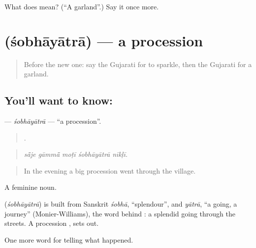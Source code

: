 \begin{tcolorbox}[breakable,colback=teal!4,colframe=teal!35!black,title={Before you move on}]
What does  mean? (\textquotedblleft{}A garland\textquotedblright{}.) Say it once more.
\end{tcolorbox}
\section[\texorpdfstring{\gu{શોભાયાત્રા} (śobhāyātrā)}{શોભાયાત્રા (śobhāyātrā)}]{ (śobhāyātrā) — a procession}

\label{lesson:GU-C329-sobhayatra}



\begin{quote}
Before the new one: say the Gujarati for to sparkle, then the Gujarati for a garland.
\end{quote}

\subsection*{You'll want to know: }
\textbf{} — \emph{śobhāyātrā} — \textquotedblleft{}a procession\textquotedblright{}.

\begin{quote}
    .
\end{quote}

\begin{quote}
\emph{sā̃je gāmmā̃ moṭī śobhāyātrā nīkḷī.}
\end{quote}

\begin{quote}
In the evening a big procession went through the village.
\end{quote}

A feminine noun.

\begin{cousinweb}
\textbf{} (\emph{śobhāyātrā}) is built from Sanskrit \emph{śobhā}, \textquotedblleft{}splendour\textquotedblright{}, and \emph{yātrā}, \textquotedblleft{}a going, a journey\textquotedblright{} (Monier-Williams), the word behind \textbf{}: a splendid going through the streets. A procession \textbf{ }, sets out.
\end{cousinweb}

\begin{grammarlens}[title={What you've built}]
One more word for telling what happened.
\end{grammarlens}

